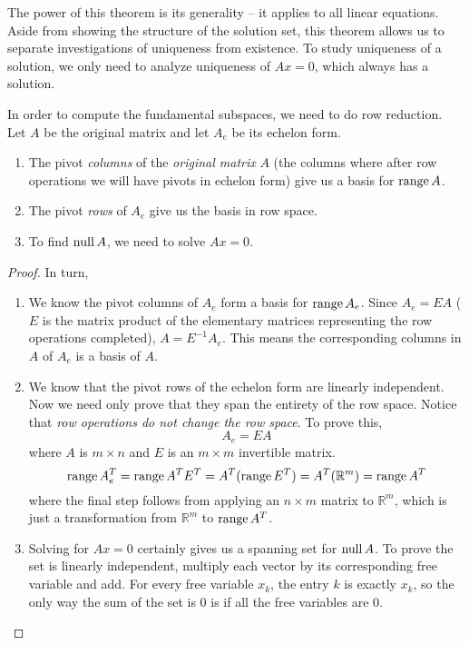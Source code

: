 The power of this theorem is its generality -- it applies to all linear equations. Aside from showing the structure of the solution set, this theorem allows us to separate investigations of uniqueness from existence. To study uniqueness of a solution, we only need to analyze uniqueness of $Ax = 0$, which always has a solution.

\begin{theorem}
In order to compute the fundamental subspaces, we need to do row reduction. Let $A$ be the original matrix and let $A_{e}$ be its echelon form. 
\begin{enumerate}
	\item The pivot \textit{columns} of the \textit{original matrix} $A$ (the columns where after row operations we will have pivots in echelon form) give us a basis for $\operatorname{range} A$. 
	\item The pivot \textit{rows} of $A_{e}$ give us the basis in row space. 
	\item To find $\operatorname{null} A$, we need to solve $Ax = 0$. 
\end{enumerate}
\end{theorem}

\begin{proof}
In turn, 
\begin{enumerate}
	\item We know the pivot columns of $A_{e}$ form a basis for $\operatorname{range} A_{e}$. Since $A_{e} = EA$ ($E$ is the matrix product of the elementary matrices representing the row operations completed), $A = E^{-1}A_{e}$. This means the corresponding columns in $A$ of $A_{e}$ is a basis of $A$. 
	
	\item We know that the pivot rows of the echelon form are linearly independent. Now we need only prove that they span the entirety of the row space. Notice that \textit{row operations do not change the row space}. To prove this, 
	$$A_{e} = EA$$
	where $A$ is $m \times n$ and $E$ is an $m \times m$ invertible matrix. 
	$$\operatorname{range} A_{e}^{T} = \operatorname{range} A^{T} E^{T} = A^{T} (\operatorname{range} E^{T}) = A^{T} (\mathbb{R}^{m}) = \operatorname{range} A^{T}$$
	where the final step follows from applying an $n \times m$ matrix to $\mathbb{R}^{m}$, which is just a transformation from $\mathbb{R}^{m}$ to $\operatorname{range} A^{T}$. 
	
	\item Solving for $Ax = 0$ certainly gives us a spanning set for  $\operatorname{null} A$. To prove the set is linearly independent, multiply each vector by its corresponding free variable and add. For every free variable $x_{k}$, the entry $k$ is exactly $x_{k}$, so the only way the sum of the set is $0$ is if all the free variables are $0$. 
\end{enumerate}
\end{proof}

